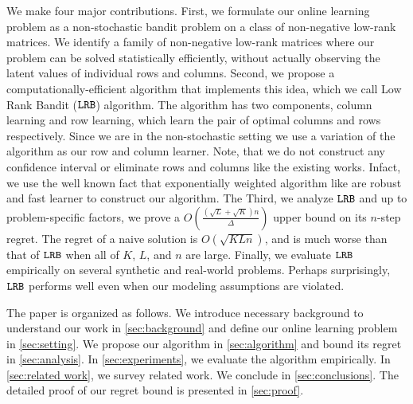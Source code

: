 
We make four major contributions. First, we formulate our online learning problem as a non-stochastic bandit problem on a class of non-negative low-rank matrices. We identify a family of non-negative low-rank matrices where our problem can be solved statistically efficiently, without actually observing the latent values of individual rows and columns. Second, we propose a computationally-efficient algorithm that implements this idea, which we call Low Rank Bandit (${\tt LRB}$) algorithm. The algorithm has two components, column learning and row learning, which learn the pair  of optimal columns and rows respectively. Since we are in the non-stochastic setting we use a variation of the \expthree \citep{auer2002nonstochastic} algorithm as our row and column learner. Note, that we do not construct any confidence interval or eliminate rows and columns like the existing works. Infact, we use the well known fact that exponentially weighted algorithm like \expthree are robust and fast learner to construct our algorithm. The Third, we analyze ${\tt LRB}$ and up to problem-specific factors, we prove a $O\left(\frac{\left(\sqrt{L } + \sqrt{K }\right)n}{\Delta}\right)$ upper bound on its $n$-step regret. The regret of a naive solution is $O(\sqrt{K L n})$, and is much worse than that of ${\tt LRB}$ when all of $K$, $L$, and $n$ are large. Finally, we evaluate ${\tt LRB}$ empirically on several synthetic and real-world problems. Perhaps surprisingly, ${\tt LRB}$ performs well even when our modeling assumptions are violated.

The paper is organized as follows. We introduce necessary background to understand our work in \cref{sec:background} and define our online learning problem in \cref{sec:setting}. We propose our algorithm in \cref{sec:algorithm} and bound its regret in \cref{sec:analysis}. In \cref{sec:experiments}, we evaluate the algorithm empirically. In \cref{sec:related work}, we survey related work. We conclude in \cref{sec:conclusions}. The detailed proof of our regret bound is presented in \cref{sec:proof}.
